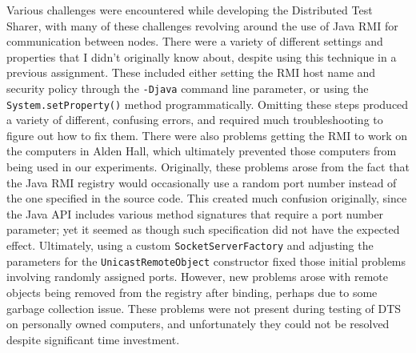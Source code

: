 \documentclass{article}
\begin{document}
{Various challenges were encountered while developing the Distributed Test Sharer, with many of these challenges revolving around the use of Java RMI for communication between nodes.  There were a variety of different settings and properties that I didn't originally know about, despite using this technique in a previous assignment.  These included either setting the RMI host name and security policy through the \texttt{-Djava} command line parameter, or using the \texttt{System.setProperty()} method programmatically.  Omitting these steps produced a variety of different, confusing errors, and required much troubleshooting to figure out how to fix them.  There were also problems getting the RMI to work on the computers in Alden Hall, which ultimately prevented those computers from being used in our experiments.  Originally, these problems arose from the fact that the Java RMI registry would occasionally use a random port number instead of the one specified in the source code.  This created much confusion originally, since the Java API includes various method signatures that require a port number parameter; yet it seemed as though such specification did not have the expected effect.  Ultimately, using a custom \texttt{SocketServerFactory} and adjusting the parameters for the \texttt{UnicastRemoteObject} constructor fixed those initial problems involving randomly assigned ports.  However, new problems arose with remote objects being removed from the registry after binding, perhaps due to some garbage collection issue.  These problems were not present during testing of DTS on personally owned computers, and unfortunately they could not be resolved despite significant time investment.

}
\end{document}
